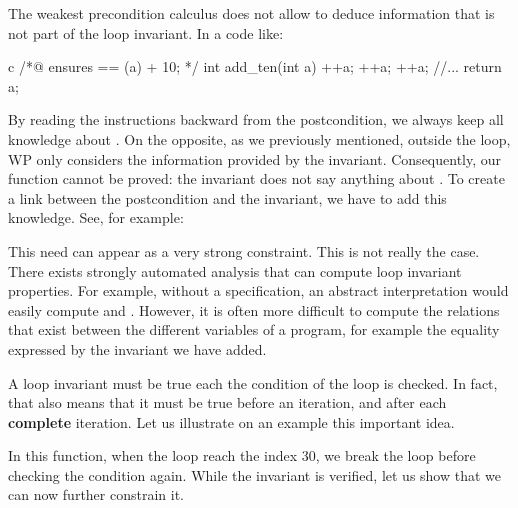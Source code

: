 


The weakest precondition calculus does not allow to deduce information
that is not part of the loop invariant. In a code like:



\begin{CodeBlock}{c}
/*@
    ensures \result == \old(a) + 10;
*/
int add_ten(int a){
    ++a;
    ++a;
    ++a;
    //...
    return a;
}
\end{CodeBlock}


By reading the instructions backward
from the postcondition, we always keep all knowledge about . On
the opposite, as we previously mentioned, outside the loop, WP only
considers the information provided by the invariant. Consequently, our
 function cannot be proved: the invariant does not say anything
about . To create a link between the postcondition and the
invariant, we have to add this knowledge. See, for example:






\begin{Information}
  This need can appear as a very strong constraint. This is not really the
  case. There exists strongly automated analysis that can compute loop
  invariant properties. For example, without a specification, an abstract
  interpretation would easily compute 
  and .
  However, it is often more difficult to compute the relations
  that exist between the different variables of a program, for
  example the equality expressed by the invariant we have
  added.
\end{Information}





A loop invariant must be true each the condition of the loop is checked. In
fact, that also means that it must be true before an iteration, and after
each \textbf{complete} iteration. Let us illustrate on an example this
important idea.






In this function, when the loop reach the index 30, we break the loop before
checking the condition again. While the invariant is verified, let us show
that we can now further constrain it.



